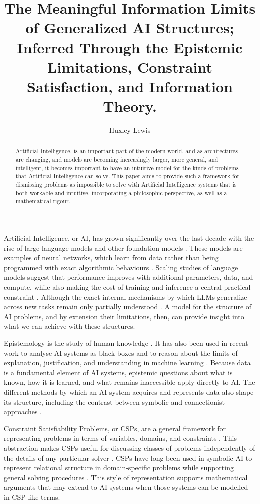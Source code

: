 \documentclass[stu,12pt]{apa7}
\title{The Meaningful Information Limits of Generalized AI Structures; Inferred Through the Epistemic Limitations, Constraint Satisfaction, and Information Theory.}
\author{Huxley Lewis}
\affiliation{Think Global School}
\theoremstyle{definition}
\begin{document}
\maketitle
\begin{abstract}
    
Artificial Intelligence, is an important part of the modern world, and as architectures are changing, and models are becoming increasingly larger, more general, and intelligent, it becomes important to have an intuitive model for the kinds of problems that Artificial Intelligence can solve. This paper aims to provide such a framework for dismissing problems as impossible to solve with Artificial Intelligence systems that is both workable and intuitive, incorporating a philosophic perspective, as well as a mathematical rigour.
\end{abstract}

Artificial Intelligence, or AI, has grown significantly over the last decade with the rise of large language models and other foundation models \parencite{bommasani2021foundation}. These models are examples of neural networks, which learn from data rather than being programmed with exact algorithmic behaviours \parencite{lecun2015deep}. Scaling studies of language models suggest that performance improves with additional parameters, data, and compute, while also making the cost of training and inference a central practical constraint \parencite{kaplan2020scaling,hoffmann2022training}. Although the exact internal mechanisms by which LLMs generalize across new tasks remain only partially understood \parencite{bommasani2021foundation}. A model for the structure of AI problems, and by extension their limitations, then, can provide insight into what we can achieve with these structures.

Epistemology is the study of human knowledge \parencite{sep-epistemology}. It has also been used in recent work to analyse AI systems as black boxes and to reason about the limits of explanation, justification, and understanding in machine learning \parencite{carabantes2020blackbox, funer2022accuracy}. Because data is a fundamental element of AI systems, epistemic questions about what is known, how it is learned, and what remains inaccessible apply directly to AI. The different methods by which an AI system acquires and represents data also shape its structure, including the contrast between symbolic and connectionist approaches \parencite{russell1995modern}.

Constraint Satisfiability Problems, or CSPs, are a general framework for representing problems in terms of variables, domains, and constraints \parencite{mackworth1977consistency}. This abstraction makes CSPs useful for discussing classes of problems independently of the details of any particular solver \parencite{dechter1992backtracking}. CSPs have long been used in symbolic AI to represent relational structure in domain-specific problems while supporting general solving procedures \parencite{mackworth1977consistency,dechter1992backtracking}. This style of representation supports mathematical arguments that may extend to AI systems when those systems can be modelled in CSP-like terms.
\end{document}
